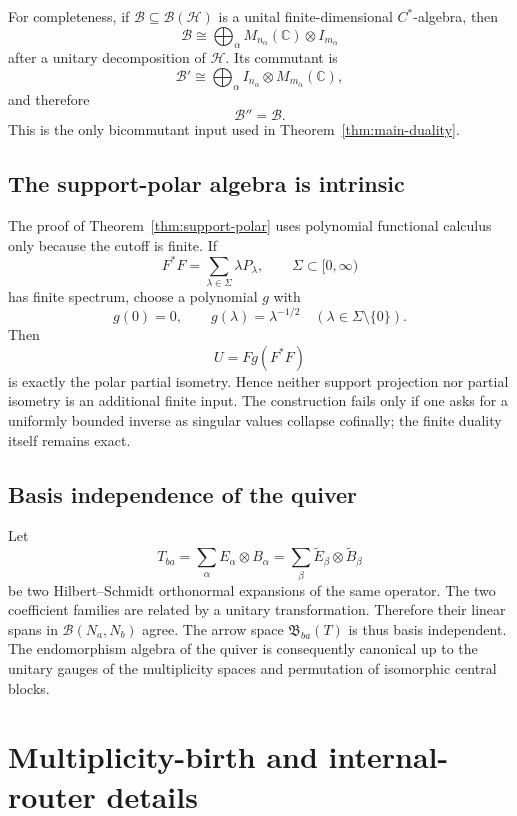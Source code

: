 \documentclass[11pt]{article}
\theoremstyle{definition}
\theoremstyle{remark}
\newcommand{\C}{\mathbb C}
\newcommand{\Hh}{\mathcal H}
\begin{document}
For completeness, if $\mathcal B\subseteq\mathcal B(\Hh)$ is a unital
finite-dimensional $C^*$-algebra, then
\[
\mathcal B\cong
\bigoplus_\alpha
M_{n_\alpha}(\C)\otimes I_{m_\alpha}
\]
after a unitary decomposition of $\Hh$.  Its commutant is
\[
\mathcal B'
\cong
\bigoplus_\alpha
I_{n_\alpha}\otimes M_{m_\alpha}(\C),
\]
and therefore
\[
\mathcal B''=\mathcal B.
\]
This is the only bicommutant input used in
Theorem~\ref{thm:main-duality}.

\subsection{The support-polar algebra is intrinsic}

The proof of Theorem~\ref{thm:support-polar} uses polynomial functional
calculus only because the cutoff is finite.  If
\[
F^*F=\sum_{\lambda\in\Sigma}\lambda P_\lambda,
\qquad
\Sigma\subset[0,\infty)
\]
has finite spectrum, choose a polynomial $g$ with
\[
g(0)=0,
\qquad
g(\lambda)=\lambda^{-1/2}
\quad(\lambda\in\Sigma\setminus\{0\}).
\]
Then
\[
U=Fg(F^*F)
\]
is exactly the polar partial isometry.  Hence neither support projection nor
partial isometry is an additional finite input.  The construction fails only
if one asks for a uniformly bounded inverse as singular values collapse
cofinally; the finite duality itself remains exact.

\subsection{Basis independence of the quiver}

Let
\[
T_{ba}
=
\sum_\alpha E_\alpha\otimes B_\alpha
=
\sum_\beta \widetilde E_\beta\otimes\widetilde B_\beta
\]
be two Hilbert--Schmidt orthonormal expansions of the same operator.
The two coefficient families are related by a unitary transformation.
Therefore their linear spans in $\mathcal B(N_a,N_b)$ agree.  The arrow space
$\mathfrak B_{ba}(T)$ is thus basis independent.  The endomorphism algebra of
the quiver is consequently canonical up to the unitary gauges of the
multiplicity spaces and permutation of isomorphic central blocks.

\section{Multiplicity-birth and internal-router details}
\label{app:internal-landing}
\end{document}
